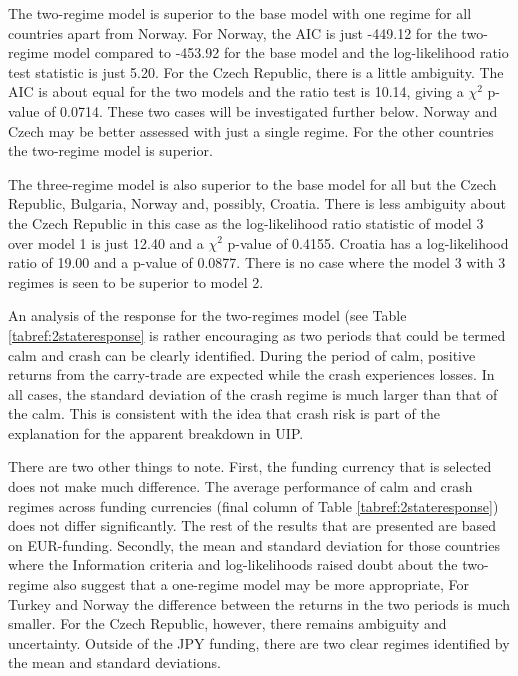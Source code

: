\documentclass[12pt, a4paper, oneside]{article} %
\begin{document}
The two-regime model is superior to the base model with one regime for all countries apart from Norway.  For Norway, the AIC is just -449.12 for the two-regime model compared to -453.92 for the base model and the log-likelihood ratio test statistic is just 5.20.  For the Czech Republic, there is a little ambiguity.  The AIC is about equal for the two models and the ratio test is 10.14, giving a $\chi^2$ p-value of 0.0714. These two cases will be investigated further below. Norway and Czech may be better assessed with just a single regime. For the other countries the two-regime model is superior.  

The three-regime model is also superior to the base model for all but the Czech Republic, Bulgaria, Norway and, possibly, Croatia.  There is less ambiguity about the Czech Republic in this case as the log-likelihood ratio statistic of model 3 over model 1 is just 12.40 and a $\chi^2$ p-value of 0.4155.  Croatia has a log-likelihood ratio of 19.00 and a p-value of 0.0877.  There is no case where the model 3 with 3 regimes is seen to be superior to model 2.  

An analysis of the response for the two-regimes model (see Table \ref{tabref:2stateresponse} is rather encouraging as two periods that could be termed calm and crash can be clearly identified. During the period of calm, positive returns from the carry-trade are expected while the crash experiences losses.  In all cases, the standard deviation of the crash regime is much larger than that of the calm.  This is consistent with the idea that crash risk is part of the explanation for the apparent breakdown in UIP.  

There are two other things to note.  First, the funding currency that is selected does not make much difference.   The average performance of calm and crash regimes across funding currencies (final column of Table \ref{tabref:2stateresponse}) does not differ significantly.  The rest of the results that are presented are based on EUR-funding.  Secondly, the mean and standard deviation for those countries where the Information criteria and log-likelihoods raised doubt about the two-regime also suggest that a one-regime model may be more appropriate,   For Turkey and Norway the difference between the returns in the two periods is much smaller.  For the Czech Republic, however, there remains ambiguity and uncertainty. Outside of the JPY funding, there are two clear regimes identified by the mean and standard deviations. 
\end{document}
